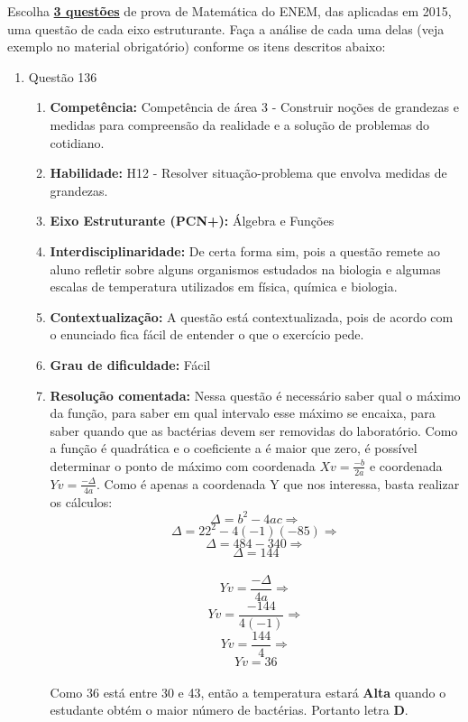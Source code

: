 \documentclass[a4paper, 12pt]{article}
\begin{document}
Escolha \underline{\textbf{3 questões}} de prova de Matemática do ENEM, das aplicadas em 2015, uma questão de cada eixo estruturante. Faça a análise de cada uma delas (veja  exemplo no material obrigatório) conforme os itens descritos abaixo:
\begin{enumerate}
\item Questão 136
  \begin{enumerate}
  \item \textbf{Competência: }
    Competência de área 3 - Construir noções de grandezas e medidas para compreensão da realidade e a solução de problemas do cotidiano.
  \item \textbf{Habilidade: }
    H12 - Resolver situação-problema que envolva medidas de grandezas.
  \item \textbf{Eixo Estruturante (PCN+): }
    Álgebra e Funções
  \item \textbf{Interdisciplinaridade: }
    De certa forma sim, pois a questão remete ao aluno refletir sobre alguns organismos estudados na biologia e algumas escalas de temperatura utilizados em física, química e biologia.
  \item \textbf{Contextualização: }
    A questão está contextualizada, pois de acordo com o enunciado fica fácil de entender o que o exercício pede.
  \item \textbf{Grau de dificuldade: }
    Fácil
  \item \textbf{Resolução comentada: }
    Nessa questão é necessário saber qual o máximo da função, para saber em qual intervalo esse máximo se encaixa, para saber quando que as bactérias devem ser removidas do laboratório. Como a função é quadrática e o coeficiente a é maior que zero, é possível determinar o ponto de máximo com coordenada $Xv=\frac{-b}{2a}$ e coordenada $Yv=\frac{-\Delta}{4a}$. Como é apenas a coordenada Y que nos interessa, basta realizar os cálculos:
    $$ \Delta = b^{2}-4ac \Rightarrow $$
    $$ \Delta = 22^{2}-4(-1)(-85) \Rightarrow $$
    $$ \Delta = 484-340 \Rightarrow $$
    $$ \boxed{\Delta = 144} $$\\

    $$Yv = \frac{-\Delta}{4a} \Rightarrow $$
    $$Yv = \frac{-144}{4(-1)} \Rightarrow $$
    $$Yv = \frac{144}{4} \Rightarrow $$
    $$\boxed{Yv = 36} $$\\
  Como 36 está entre 30 e 43, então a temperatura estará \textbf{Alta} quando o estudante obtém o maior número de bactérias. Portanto letra \textbf{D}.
    

\end{enumerate}
\end{enumerate}
\end{document}
